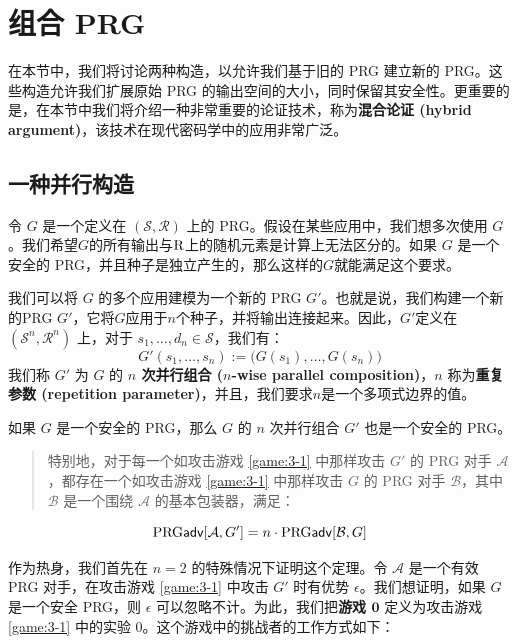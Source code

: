 \section{组合 PRG}

在本节中，我们将讨论两种构造，以允许我们基于旧的 PRG 建立新的 PRG。这些构造允许我们扩展原始 PRG 的输出空间的大小，同时保留其安全性。更重要的是，在本节中我们将介绍一种非常重要的论证技术，称为\textbf{混合论证 (hybrid argument)}，该技术在现代密码学中的应用非常广泛。

\subsection{一种并行构造}\label{subsec:3-4-1}

令 $G$ 是一个定义在 $(\mathcal S,\mathcal R)$ 上的 PRG。假设在某些应用中，我们想多次使用 $G$。我们希望$G$的所有输出与$\mathcal{\rm R}$上的随机元素是计算上无法区分的。如果 $G$ 是一个安全的 PRG，并且种子是独立产生的，那么这样的$G$就能满足这个要求。

我们可以将 $G$ 的多个应用建模为一个新的 PRG $G'$。也就是说，我们构建一个新的PRG $G'$，它将$G$应用于$n$个种子，并将输出连接起来。因此，$G'$定义在 $(\mathcal S^n,\mathcal R^n)$ 上，对于 $s_1,\dots,d_n\in\mathcal S$，我们有：
$$
G'(s_1,\dots,s_n):=\big(G(s_1),\dots,G(s_n)\big)
$$
我们称 $G'$ 为 $G$ 的 \textbf{$n$ 次并行组合 ($n$-wise parallel composition)}，$n$ 称为\textbf{重复参数 (repetition parameter)}，并且，我们要求$n$是一个多项式边界的值。

\begin{theorem}\label{theo:3-2}
如果 $G$ 是一个安全的 PRG，那么 $G$ 的 $n$ 次并行组合 $G'$ 也是一个安全的 PRG。
\begin{quote}
特别地，对于每一个如攻击游戏 \ref{game:3-1} 中那样攻击 $G'$ 的 PRG 对手 $\mathcal A$，都存在一个如攻击游戏 \ref{game:3-1} 中那样攻击 $G$ 的 PRG 对手 $\mathcal B$，其中 $\mathcal B$ 是一个围绕 $\mathcal A$ 的基本包装器，满足：
\end{quote}
$$
{\rm PRG\mathsf{adv}}[\mathcal{A},G']=n\cdot{\rm PRG\mathsf{adv}}[\mathcal{B},G]
$$
\end{theorem}

作为热身，我们首先在 $n=2$ 的特殊情况下证明这个定理。令 $\mathcal A$ 是一个有效 PRG 对手，在攻击游戏 \ref{game:3-1} 中攻击 $G'$ 时有优势 $\epsilon$。我们想证明，如果 $G$ 是一个安全 PRG，则 $\epsilon$ 可以忽略不计。为此，我们把\textbf{游戏 $\mathbf{0}$} 定义为攻击游戏 \ref{game:3-1} 中的实验 $0$。这个游戏中的挑战者的工作方式如下：

\vspace*{5pt}

